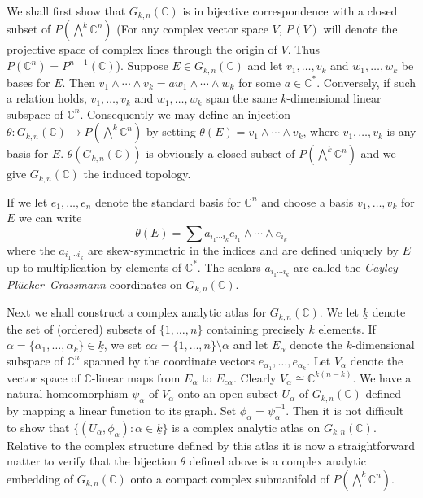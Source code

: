 We shall first show that $G_{k,n}(\mathbb C)$ is in bijective correspondence with a closed subset of $P(\bigwedge^k\mathbb C^n)$ (For any complex vector space $V$, $P(V)$ will denote the projective space of complex lines through the origin of $V$. Thus $P(\mathbb C^n)=P^{n-1}(\mathbb C)$). Suppose $E\in G_{k,n}(\mathbb C)$ and let $v_1,\ldots,v_k$ and $w_1,\ldots,w_k$ be bases for $E$. Then $v_1\wedge\cdots\wedge v_k=aw_1\wedge\cdots\wedge w_k$ for some $a\in\mathbb C^*$. Conversely, if such a relation holds, $v_1,\ldots,v_k$ and $w_1,\ldots,w_k$ span the same $k$-dimensional linear subspace of $\mathbb C^n$. Consequently we may
define an injection $\theta:G_{k,n}(\mathbb C)\longrightarrow P(\bigwedge^k\mathbb C^n)$ by setting $\theta(E)=v_1\wedge\cdots\wedge v_k$, where $v_1,\ldots,v_k$ is any basis for $E$. $\theta(G_{k,n}(\mathbb C))$ is obviously a closed subset of $P(\bigwedge^k\mathbb C^n)$ and we give $G_{k,n}(\mathbb C)$ the induced topology.

If we let $e_1,\ldots,e_n$ denote the standard basis for $\mathbb C^n$ and choose a basis $v_1,\ldots,v_k$ for $E$ we can write
\[
\theta(E)=\sum a_{i_1\cdots i_k}e_{i_1}\wedge\cdots\wedge e_{i_k}
\]
where the $a_{i_1\cdots i_k}$ are skew-symmetric in the indices and are defined uniquely by $E$ up to multiplication by elements of $\mathbb C^*$. The scalars $a_{i_1\cdots i_k}$ are called the \emph{Cayley--Pl\"ucker--Grassmann} coordinates on $G_{k,n}(\mathbb C)$.

Next we shall construct a complex analytic atlas for $G_{k,n}(\mathbb C)$. We let $\underline k$ denote the set of (ordered) subsets of $\{1,\ldots,n\}$ containing precisely $k$ elements. If $\alpha=\{\alpha_1,\ldots,\alpha_k\}\in\underline k$, we set $c\alpha=\{1,\ldots,n\}\setminus\alpha$ and let $E_\alpha$ denote the $k$-dimensional subspace of $\mathbb C^n$ spanned by the coordinate vectors $e_{\alpha_1},\ldots,e_{\alpha_k}$. Let $V_\alpha$ denote the vector space of $\mathbb C$-linear maps from $E_\alpha$ to $E_{c\alpha}$. Clearly $V_\alpha\cong\mathbb C^{k(n-k)}$. We have a natural homeomorphism $\psi_\alpha$ of $V_\alpha$ onto an open subset $U_\alpha$ of $G_{k,n}(\mathbb C)$ defined by mapping a linear function to its graph. Set $\phi_\alpha=\psi_\alpha^{-1}$. Then it is not difficult to show that $\{(U_\alpha,\phi_\alpha):\alpha\in\underline k\}$ is a complex analytic atlas on $G_{k,n}(\mathbb C)$. Relative to the complex structure defined by this atlas it is now a straightforward matter to verify that the bijection $\theta$ defined above is a complex analytic embedding of $G_{k,n}(\mathbb C)$ onto a compact complex submanifold of $P(\bigwedge^k\mathbb C^n)$.

